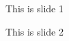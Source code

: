 \documentclass[landscape]{slides}
\begin{document}
\begin{slide}
This is slide 1
\end{slide}

\begin{slide}
This is slide 2
\end{slide}
\end{document}
